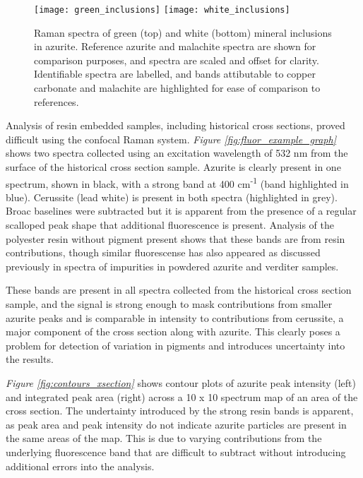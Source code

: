 \begin{figure}[H]
\centering
\begin{minipage}[t]{\linewidth}
  \centering
  \texttt{[image: green\_inclusions]}
\hfill
\texttt{[image: white\_inclusions]}
\hfill
\end{minipage}
\caption[Raman spectra of green and white mineral inclusions in azurite.]{Raman spectra of green (top) and white (bottom) mineral inclusions in azurite. Reference azurite and malachite spectra are shown for comparison purposes, and spectra are scaled and offset for clarity. Identifiable spectra are labelled, and bands attibutable to copper carbonate and malachite are highlighted for ease of comparison to references.}
\label{fig:label_raman}
\end{figure}










Analysis of resin embedded samples, including historical cross sections, proved difficult using the confocal Raman system. \textit{Figure \ref{fig:fluor_example_graph}} shows two spectra collected using an excitation wavelength of 532 nm from the surface of the historical cross section sample. Azurite is clearly present in one spectrum, shown in black, with a strong band at 400 cm\textsuperscript{-1} (band highlighted in blue). Cerussite (lead white) is present in both spectra (highlighted in grey). Broac baselines were subtracted but it is apparent from the presence of a regular scalloped peak shape that additional fluorescence is present. Analysis of the polyester resin without pigment present shows that these bands are from resin contributions, though similar fluorescense has also appeared as discussed previously in spectra of impurities in powdered azurite and verditer samples. 

These bands are present in all spectra collected from the historical cross section sample, and the signal is strong enough to mask contributions from smaller azurite peaks and is comparable in intensity to contributions from cerussite, a major component of the cross section along with azurite. This clearly poses a problem for detection of variation in pigments and introduces uncertainty into the results.

\textit{Figure \ref{fig:contours_xsection}} shows contour plots of azurite peak intensity (left) and integrated peak area (right) across a 10 x 10 spectrum map of an area of the cross section. The undertainty introduced by the strong resin bands is apparent, as peak area and peak intensity do not indicate azurite particles are present in the same areas of the map. This is due to varying contributions from the underlying fluorescence band that are difficult to subtract without introducing additional errors into the analysis.

